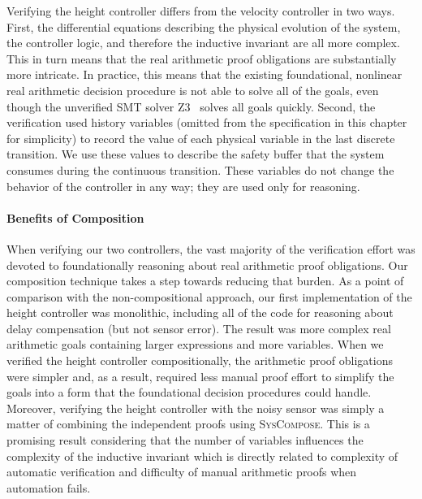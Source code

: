 Verifying the height controller differs from the velocity controller in two
ways.  First, the differential equations describing the physical evolution
of the system, the controller logic, and therefore the inductive invariant
are all more complex.  This in turn means that the real arithmetic proof
obligations are substantially more intricate.  In practice, this means that
the existing foundational, nonlinear real arithmetic decision procedure is
not able to solve all of the goals, even though the unverified SMT solver
Z3~\cite{demoura2008z3} solves all goals quickly.  Second, the verification
used history variables (omitted from the specification in this chapter for
simplicity) to record the value of each physical variable in the last
discrete transition.  We use these values to describe the safety buffer
that the system consumes during the continuous transition.  These variables
do not change the behavior of the controller in any way; they are used only
for reasoning.

\paragraph*{Benefits of Composition}
When verifying our two controllers, the vast majority of the verification
effort was devoted to foundationally reasoning about real arithmetic proof
obligations.  Our composition technique takes a step towards reducing that
burden.  As a point of comparison with the non-compositional approach, our
first implementation of the height controller was monolithic, including all
of the code for reasoning about delay compensation (but not sensor error).
The result was more complex real arithmetic goals containing larger
expressions and more variables.  When we verified the height controller
compositionally, the arithmetic proof obligations were simpler and, as a
result, required less manual proof effort to simplify the goals into a form
that the foundational decision procedures could handle.  Moreover,
verifying the height controller with the noisy sensor was simply a matter
of combining the independent proofs using \textsc{SysCompose}.  This is a
promising result considering that the number of variables influences the
complexity of the inductive invariant which is directly related to
complexity of automatic verification and difficulty of manual arithmetic
proofs when automation fails.

